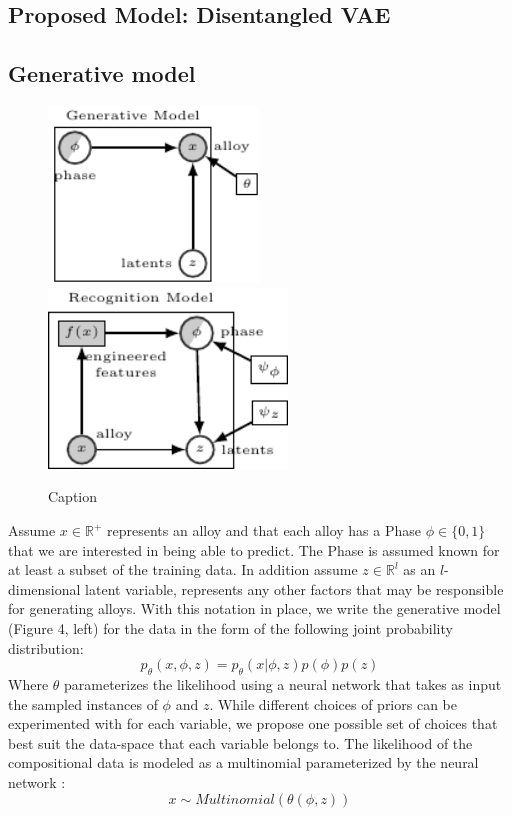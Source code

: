 \documentclass[a4paper]{article}
\begin{document}
\subsection{Proposed Model: Disentangled VAE}

\subsection{Generative model}
\begin{figure}[H]
    \centering
    \includegraphics[width=2.2in]{figures/HEA_Graphical_Model_Generative_Phase.pdf}
    \includegraphics[width=2.5in]{figures/HEA_Graphical_Model_Recognition_Phase.pdf}
    \caption{Caption}
    \label{fig:vae_model}
\end{figure}

Assume $x \in \mathbb{R}^+$ represents an alloy and that each alloy has a Phase $\phi \in \{0, 1\}$ that we are interested in being able to predict. The Phase is assumed known for at least a subset of the training data. In addition assume $z \in \mathbb{R}^l$ as an  $l$- dimensional latent variable, represents any other factors that may be responsible for generating alloys. With this notation in place, we write the generative model (Figure 4, left) for the data in the form of the following joint probability distribution:
\begin{equation}
    p_\theta(x, \phi, z) = p_\theta(x| \phi, z)p(\phi)p(z)
\end{equation}
Where $\theta$ parameterizes the likelihood using a neural network that takes as input the sampled instances of $\phi$ and $z$. While different choices of priors can be experimented with for each variable, we propose one possible set of choices that best suit the data-space that each variable belongs to. The likelihood of the compositional data is modeled as a multinomial parameterized by the neural network :
\begin{equation}
    x \sim Multinomial(\theta(\phi, z))
\end{equation}
\end{document}
